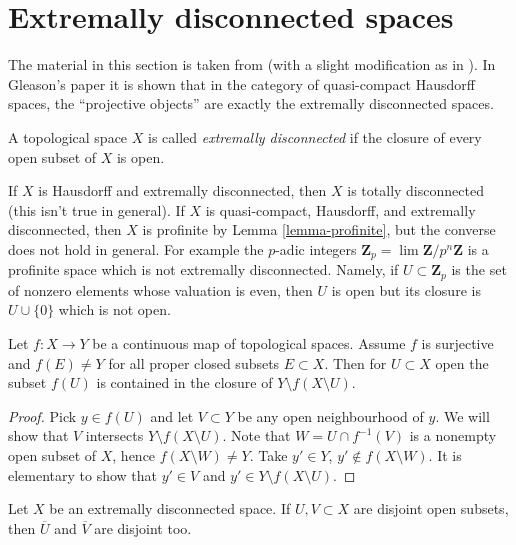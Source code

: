 \section{Extremally disconnected spaces}
\label{section-extremally-disconnected}

\noindent
The material in this section is taken from \cite{Gleason}
(with a slight modification as in \cite{Rainwater}).
In Gleason's paper it is shown that in the category of quasi-compact
Hausdorff spaces, the ``projective objects'' are exactly the extremally
disconnected spaces.

\begin{definition}
\label{definition-extremally-disconnected}
A topological space $X$ is called {\it extremally disconnected}
if the closure of every open subset of $X$ is open.
\end{definition}

\noindent
If $X$ is Hausdorff and extremally disconnected, then $X$ is totally
disconnected (this isn't true in general). If $X$ is quasi-compact,
Hausdorff, and extremally disconnected, then $X$ is profinite by
Lemma \ref{lemma-profinite}, but the converse does not hold in general.
For example the $p$-adic integers
$\mathbf{Z}_p = \lim \mathbf{Z}/p^n\mathbf{Z}$ is a profinite space
which is not extremally disconnected. Namely, if $U \subset \mathbf{Z}_p$
is the set of nonzero elements whose valuation is even, then $U$ is open
but its closure is $U \cup \{0\}$ which is not open.

\begin{lemma}
\label{lemma-image-open-technical}
Let $f : X \to Y$ be a continuous map of topological spaces.
Assume $f$ is surjective and $f(E) \not = Y$ for all proper
closed subsets $E \subset X$. Then for $U \subset X$ open the subset
$f(U)$ is contained in the closure of $Y \setminus f(X \setminus U)$.
\end{lemma}

\begin{proof}
Pick $y \in f(U)$ and let $V \subset Y$ be any open neighbourhood of $y$.
We will show that $V$ intersects $Y \setminus f(X \setminus U)$.
Note that $W = U \cap f^{-1}(V)$ is a nonempty open subset of $X$, hence
$f(X \setminus W) \not = Y$. Take $y' \in Y$, $y' \not \in f(X \setminus W)$.
It is elementary to show that $y' \in V$ and
$y' \in Y \setminus f(X \setminus U)$.
\end{proof}

\begin{lemma}
\label{lemma-intersection-empty}
Let $X$ be an extremally disconnected space.
If $U, V \subset X$ are disjoint open subsets, then
$\overline{U}$ and $\overline{V}$ are disjoint too.
\end{lemma}

